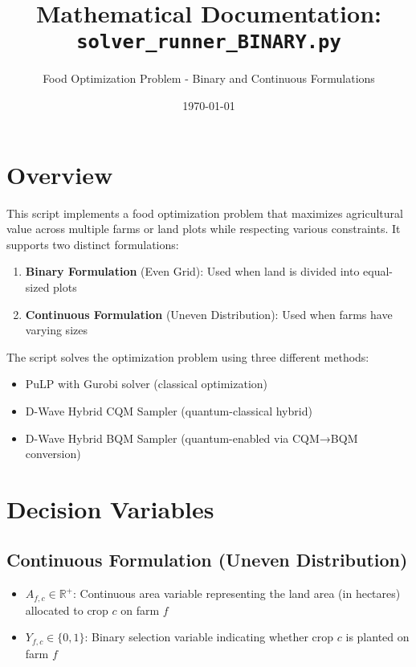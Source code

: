 \documentclass{article}
\title{Mathematical Documentation: \texttt{solver\_runner\_BINARY.py}}
\author{Food Optimization Problem - Binary and Continuous Formulations}
\date{\today}
\begin{document}
\maketitle

\tableofcontents
\newpage

\section{Overview}

This script implements a food optimization problem that maximizes agricultural value across multiple farms or land plots while respecting various constraints. It supports two distinct formulations:

\begin{enumerate}
    \item \textbf{Binary Formulation} (Even Grid): Used when land is divided into equal-sized plots
    \item \textbf{Continuous Formulation} (Uneven Distribution): Used when farms have varying sizes
\end{enumerate}

The script solves the optimization problem using three different methods:
\begin{itemize}
    \item PuLP with Gurobi solver (classical optimization)
    \item D-Wave Hybrid CQM Sampler (quantum-classical hybrid)
    \item D-Wave Hybrid BQM Sampler (quantum-enabled via CQM→BQM conversion)
\end{itemize}

\section{Decision Variables}

\subsection{Continuous Formulation (Uneven Distribution)}

\begin{itemize}
    \item $A_{f,c} \in \mathbb{R}^+$: Continuous area variable representing the land area (in hectares) allocated to crop $c$ on farm $f$
    \item $Y_{f,c} \in \{0,1\}$: Binary selection variable indicating whether crop $c$ is planted on farm $f$
\end{itemize}
\end{document}
